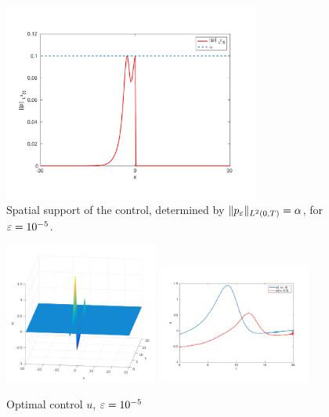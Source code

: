 \begin{figure}[!h]
\includegraphics[width = 0.75\textwidth]{images/norm2p.pdf}
\caption{Spatial support of the control, determined by $\lVert p_{\varepsilon}\rVert_{L^2(0,T)} = \alpha$, for $\varepsilon = 10^{-5}$.}
\label{supportIP}
\end{figure}

\begin{figure}[!h]
 \includegraphics[width = 0.45\textwidth]{images/ex2optcontrol3d.png}
 \includegraphics[width = 0.45\textwidth]{images/ex2utime.pdf}
 \caption{Optimal control $u$, $\varepsilon = 10^{-5}$}
 \label{recoveredcontrol2}
\end{figure}


